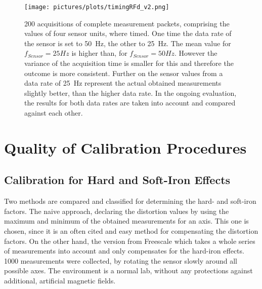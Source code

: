 \begin{figure}[!htb]
\centering
\texttt{[image: pictures/plots/timingRFd\_v2.png]}
\caption[Timing behaviour of sensor system]
{200 acquisitions of complete measurement packets, comprising the values of four sensor units, where timed. One time the data rate of the sensor is set to \SI{50}{\Hz}, the other to \SI{25}{\Hz}. The mean value for $ f_{Sensor}=25\si{Hz} $ is higher than, for $ f_{Sensor}=50\si{Hz} $. However the variance of the acquisition time is smaller for this and therefore the outcome is more consistent. Further on the sensor values from a data rate of \SI{25}{\Hz} represent the actual obtained measurements slightly better, than the higher data rate. In the ongoing evaluation, the results for both data rates are taken into account and compared against each other.}
\label{fig:sensTime}
\end{figure}

\FloatBarrier
\section{Quality of Calibration Procedures} \label{sec:cali}

\subsection{Calibration for Hard and Soft-Iron Effects}\label{subsec:resHardSoft}

Two methods are compared and classified for determining the hard- and soft-iron factors. The naive approach, declaring the distortion values by using the maximum and minimum of the obtained measurements for an axis. This one is chosen, since it is an often cited and easy method for compensating the distortion factors. On the other hand, the version from Freescale \cite{ozyagcilar2012calibrating} which takes a whole series of measurements into account and only compensates for the hard-iron effects. 1000 measurements were collected, by rotating the sensor slowly around all possible axes. The environment is a normal lab, without any protections against additional, artificial magnetic fields. 

